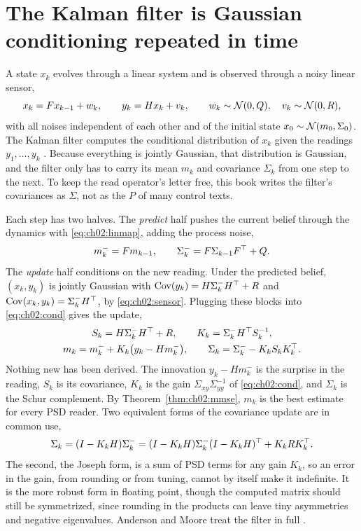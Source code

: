\section{The Kalman filter is Gaussian conditioning repeated in time}\label{sec:ch02:kalman}

A state $x_k$ evolves through a linear system and is observed through a noisy
linear sensor,
\begin{equation}\label{eq:ch02:model}
x_{k}=F x_{k-1}+w_k,\qquad y_k=Hx_k+v_k,\qquad
w_k\sim\mathcal{N}(0,Q),\quad v_k\sim\mathcal{N}(0,R),
\end{equation}
with all noises independent of each other and of the initial state
$x_0\sim\mathcal{N}(m_0,\Sigma_0)$. The Kalman filter computes the conditional
distribution of $x_k$ given the readings $y_1,\dots,y_k$ \cite{kalman1960}. Because
everything is jointly Gaussian, that distribution is Gaussian, and the filter
only has to carry its mean $m_k$ and covariance $\Sigma_k$ from one step to the
next. To keep the read operator's letter free, this book writes the filter's
covariances as $\Sigma$, not as the $P$ of many control texts.

Each step has two halves. The \emph{predict} half pushes the current belief
through the dynamics with \cref{eq:ch02:linmap}, adding the process noise,
\begin{equation}\label{eq:ch02:predict}
m_k^-=F m_{k-1},\qquad \Sigma_k^-=F\Sigma_{k-1}F^{\top}+Q .
\end{equation}
The \emph{update} half conditions on the new reading. Under the predicted
belief, $(x_k,y_k)$ is jointly Gaussian with $\operatorname{Cov}(y_k)=H\Sigma_k^-H^{\top}+R$ and
$\operatorname{Cov}(x_k,y_k)=\Sigma_k^-H^{\top}$, by \cref{eq:ch02:sensor}. Plugging these blocks
into \cref{eq:ch02:cond} gives the update,
\begin{equation}\label{eq:ch02:update}
\begin{gathered}
S_k=H\Sigma_k^-H^{\top}+R,\qquad K_k=\Sigma_k^-H^{\top} S_k^{-1},\\
m_k=m_k^-+K_k\big(y_k-Hm_k^-\big),\qquad
\Sigma_k=\Sigma_k^--K_kS_kK_k^{\top} .
\end{gathered}
\end{equation}
Nothing new has been derived. The innovation $y_k-Hm_k^-$ is the surprise in
the reading, $S_k$ is its covariance, $K_k$ is the gain $\Sigma_{xy}\Sigma_{yy}^{-1}$
of \cref{eq:ch02:cond}, and $\Sigma_k$ is the Schur complement. By
Theorem~\ref{thm:ch02:mmse}, $m_k$ is the best estimate for every PSD reader. Two
equivalent forms of the covariance update are in common use,
\begin{equation}\label{eq:ch02:joseph}
\Sigma_k=(I-K_kH)\Sigma_k^-
=(I-K_kH)\Sigma_k^-(I-K_kH)^{\top}+K_kRK_k^{\top} .
\end{equation}
The second, the Joseph form, is a sum of PSD terms for any gain $K_k$, so an
error in the gain, from rounding or from tuning, cannot by itself make it
indefinite. It is the more robust form in floating point, though the computed
matrix should still be symmetrized, since rounding in the products can leave
tiny asymmetries and negative eigenvalues. Anderson and Moore treat the filter
in full \cite{andersonmoore1979}.

